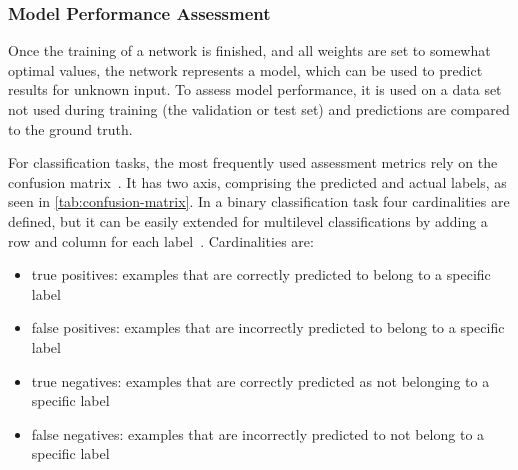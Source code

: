 

\subsubsection{Model Performance Assessment} \label{subsubsec:model-performance-assessment}
Once the training of a network is finished, and all weights are set to somewhat optimal values, the network represents a model, which can be used to predict results for unknown input.
To assess model performance, it is used on a data set not used during training (the validation or test set) and predictions are compared to the ground truth.

For classification tasks, the most frequently used assessment metrics rely on the confusion matrix~\autocite{Reinke2022}.
It has two axis, comprising the predicted and actual labels, as seen in \autoref{tab:confusion-matrix}.
In a binary classification task four cardinalities are defined, but it can be easily extended for multilevel classifications by adding a row and column for each label~\autocite{Reinke2022}.
Cardinalities are:
\begin{itemize}
    \item true positives: examples that are correctly predicted to belong to a specific label
    \item false positives: examples that are incorrectly predicted to belong to a specific label
    \item true negatives: examples that are correctly predicted as not belonging to a specific label
    \item false negatives: examples that are incorrectly predicted to not belong to a specific label
\end{itemize}

